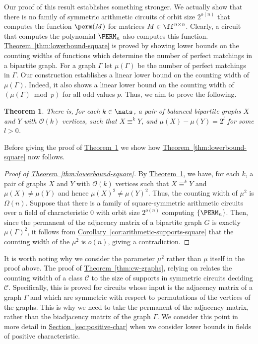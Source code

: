 \documentclass[11pt]{article}
\newcommand{\expref}[2]{\texorpdfstring{\hyperref[#2]{#1~\ref{#2}}}{#1~\ref{#2}}}
\newtheorem{theorem}{Theorem}[section]
\begin{document}
Our proof of this result establishes something stronger. We actually show that
there is no family of symmetric arithmetic circuits of orbit size $2^{o(n)}$
that computes the function $\perm(M)$ for matrices $M \in \ff^{n \times n}$.
Clearly, a circuit that computes the polynomial $\PERM_n$ also computes this
function. \expref{Theorem}{thm:lowerbound-square} is proved by showing lower bounds on the
counting widths of functions which determine the number of perfect matchings in
a bipartite graph.
For a graph $\Gamma$ let $\mu(\Gamma)$ be the number of perfect matchings in $\Gamma$.  Our construction establishes a linear lower bound on the counting width of $\mu(\Gamma)$.  Indeed, it also shows a linear lower bound on the counting width of $(\mu(\Gamma) \bmod p)$
for all odd values $p$.
Thus, we aim to prove the following.
\begin{theorem}\label{thm:matching}
  There is, for each $k \in \nats$, a pair of balanced bipartite graphs $X$ and
  $Y$ with $\mathcal{O}(k)$ vertices, such that $X \equiv^k Y$, and $\mu(X) -
  \mu(Y) = 2^l$ for some $l >0$.
\end{theorem}
Before giving the proof of \expref{Theorem}{thm:matching} we show how
\expref{Theorem}{thm:lowerbound-square} now follows.
\begin{proof}[Proof of \expref{Theorem}{thm:lowerbound-square}]
  By \expref{Theorem}{thm:matching}, we have, for each $k$, a pair of graphs $X$ and $Y$
  with $\mathcal{O}(k)$ vertices such that  $X
  \equiv^k Y$ and $\mu(X) \neq \mu(Y)$ and hence $\mu(X)^2 \neq \mu(Y)^2$.  Thus, the counting width of $\mu^2$  is $\Omega(n)$.
  Suppose that there is a family of square-symmetric arithmetic circuits over a
  field of characteristic $0$ with orbit size $2^{o(n)}$ computing
  $\{\PERM_n\}$.  Then, since the permanent of the adjacency matrix of a bipartite graph $G$ is exactly $\mu(\Gamma)^2$, it follows from
  \expref{Corollary}{cor:arithmetic-supports-square} that the counting width of the
  $\mu^2$ is $o(n)$, giving a contradiction.
\end{proof}
It is worth noting why we consider the parameter $\mu^2$ rather than $\mu$ itself in the proof above.  The proof of \expref{Theorem}{thm:cw-graphs}, relying on \cite[Theorem 6]{AndersonD17} relates the counting witdth of a class $\mathcal{C}$ to the size of supports in symmetric circuits deciding $\mathcal{C}$.  Specifically, this is proved for circuits whose input is the adjacency matrix of a graph $\Gamma$ and which are symmetric with respect to permutations of the vertices of the graphs.  This is why we need to take the permanent of the adjacency matrix, rather than the biadjacency matrix of the graph $\Gamma$.  We consider this point in more detail in \expref{Section}{sec:positive-char} when we consider lower bounds in fields of positive characteristic.
\end{document}
